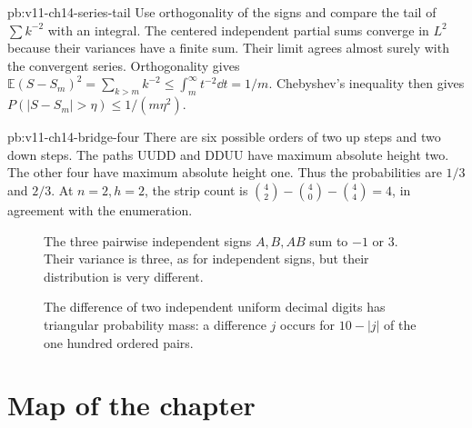\begin{solution}{pb:v11-ch14-series-tail}
\idea Use orthogonality of the signs and compare the tail of $\sum k^{-2}$ with an integral.
\writeup The centered independent partial sums converge in $L^2$ because their variances have a finite sum. Their limit agrees almost surely with the convergent series. Orthogonality gives $\mathbb E(S-S_m)^2=\sum_{k>m}k^{-2}\le\int_m^\infty t^{-2}\dd t=1/m$. Chebyshev's inequality then gives $P(|S-S_m|>\eta)\le1/(m\eta^2)$.
\end{solution}

\begin{solution}{pb:v11-ch14-bridge-four}
\idea There are six possible orders of two up steps and two down steps.
\writeup The paths UUDD and DDUU have maximum absolute height two. The other four have maximum absolute height one. Thus the probabilities are $1/3$ and $2/3$. At $n=2,h=2$, the strip count is $\binom42-\binom40-\binom44=4$, in agreement with the enumeration.
\end{solution}

\begin{figure}[ht]
\centering{}
\caption{The three pairwise independent signs $A,B,AB$ sum to $-1$ or $3$. Their variance is three, as for independent signs, but their distribution is very different.}
\label{fig:v11-ch14-pairwise-signs}
\end{figure}

\begin{figure}[ht]
\centering{}
\caption{The difference of two independent uniform decimal digits has triangular probability mass: a difference $j$ occurs for $10-|j|$ of the one hundred ordered pairs.}
\label{fig:v11-ch14-digit-difference}
\end{figure}

\section*{Map of the chapter}

